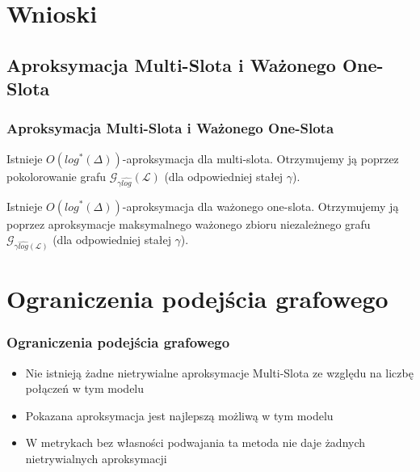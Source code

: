 \documentclass[polish, t,10pt]{beamer}
\begin{document}
\section{Wnioski}
\subsection{Aproksymacja Multi-Slota i Ważonego One-Slota}
    \begin{frame}
        \frametitle{Aproksymacja Multi-Slota i Ważonego One-Slota}
        \begin{theorem}
            Istnieje $O(log^{*}(\Delta))$-aproksymacja dla multi-slota. Otrzymujemy ją poprzez pokolorowanie grafu $\mathcal{G}_{\gamma \widehat{log}}(\mathcal{L})$ (dla odpowiedniej stałej $\gamma$).
        \end{theorem}
        \begin{theorem}
            Istnieje $O(log^{*}(\Delta))$-aproksymacja dla ważonego one-slota. Otrzymujemy ją poprzez aproksymacje maksymalnego ważonego zbioru niezależnego grafu $\mathcal{G}_{\gamma \widehat{log}(\mathcal{L})}$ (dla odpowiedniej stałej $\gamma$).
        \end{theorem}
    \end{frame}

\section{Ograniczenia podejścia grafowego}
    \begin{frame}
        \frametitle{Ograniczenia podejścia grafowego}
        \begin{itemize}
            \item Nie istnieją żadne nietrywialne aproksymacje Multi-Slota ze względu na liczbę połączeń w tym modelu
            \item Pokazana aproksymacja jest najlepszą możliwą w tym modelu
            \item W metrykach bez własności podwajania ta metoda nie daje żadnych nietrywialnych aproksymacji
        \end{itemize}
    \end{frame}
\end{document}
